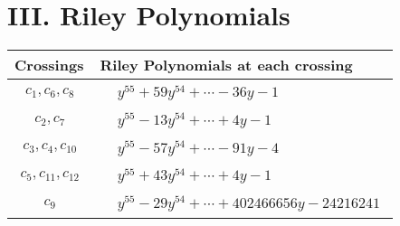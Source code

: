 \documentclass[1p]{elsarticle_modified}
\theoremstyle{definition}
\begin{document}
\centering \section*{ III. Riley Polynomials}
\begin{tabular}{m{50pt}|m{274pt}}
Crossings & \hspace{64pt}Riley Polynomials at each crossing \\
\hline $$\begin{aligned}c_{1},c_{6},c_{8}\end{aligned}$$&$\begin{aligned}
&y^{55}+59 y^{54}+\cdots-36 y-1
\end{aligned}$\\
\hline $$\begin{aligned}c_{2},c_{7}\end{aligned}$$&$\begin{aligned}
&y^{55}-13 y^{54}+\cdots+4 y-1
\end{aligned}$\\
\hline $$\begin{aligned}c_{3},c_{4},c_{10}\end{aligned}$$&$\begin{aligned}
&y^{55}-57 y^{54}+\cdots-91 y-4
\end{aligned}$\\
\hline $$\begin{aligned}c_{5},c_{11},c_{12}\end{aligned}$$&$\begin{aligned}
&y^{55}+43 y^{54}+\cdots+4 y-1
\end{aligned}$\\
\hline $$\begin{aligned}c_{9}\end{aligned}$$&$\begin{aligned}
&y^{55}-29 y^{54}+\cdots+402466656 y-24216241
\end{aligned}$\\
\hline
\end{tabular}
\vskip 2pc
\end{document}
